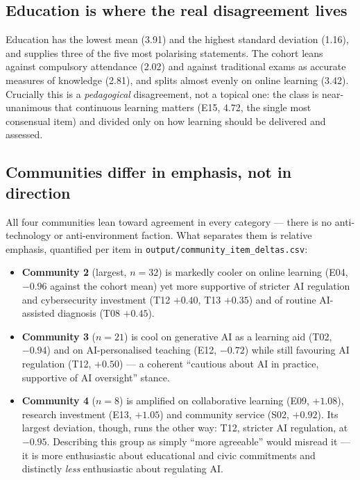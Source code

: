 \documentclass[11pt,a4paper]{article}
\begin{document}
\subsection{Education is where the real disagreement lives}
Education has the lowest mean (3.91) and the highest standard deviation (1.16), and supplies three of the five most polarising statements. The cohort leans against compulsory attendance (2.02) and against traditional exams as accurate measures of knowledge (2.81), and splits almost evenly on online learning (3.42). Crucially this is a \emph{pedagogical} disagreement, not a topical one: the class is near-unanimous that continuous learning matters (E15, 4.72, the single most consensual item) and divided only on how learning should be delivered and assessed.

\subsection{Communities differ in emphasis, not in direction}\label{sec:communities}
All four communities lean toward agreement in every category --- there is no anti-technology or anti-environment faction. What separates them is relative emphasis, quantified per item in \texttt{output/community\_item\_deltas.csv}:

\begin{itemize}
\item \textbf{Community 2} (largest, $n = 32$) is markedly cooler on online learning (E04, $-0.96$ against the cohort mean) yet more supportive of stricter AI regulation and cybersecurity investment (T12 $+0.40$, T13 $+0.35$) and of routine AI-assisted diagnosis (T08 $+0.45$).
\item \textbf{Community 3} ($n = 21$) is cool on generative AI as a learning aid (T02, $-0.94$) and on AI-personalised teaching (E12, $-0.72$) while still favouring AI regulation (T12, $+0.50$) --- a coherent ``cautious about AI in practice, supportive of AI oversight'' stance.
\item \textbf{Community 4} ($n = 8$) is amplified on collaborative learning (E09, $+1.08$), research investment (E13, $+1.05$) and community service (S02, $+0.92$). Its largest deviation, though, runs the other way: T12, stricter AI regulation, at $-0.95$. Describing this group as simply ``more agreeable'' would misread it --- it is more enthusiastic about educational and civic commitments and distinctly \emph{less} enthusiastic about regulating AI.
\end{itemize}
\end{document}
